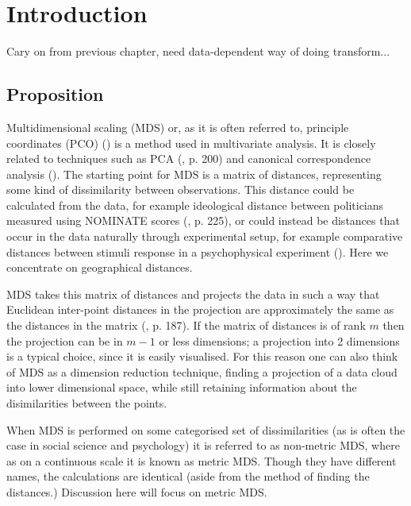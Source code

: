 
\label{chap-mds}

\section{Introduction}

Cary on from previous chapter, need data-dependent way of doing transform...

\subsection{Proposition}

Multidimensional scaling (MDS) or, as it is often referred to, principle coordinates (PCO) (\cite{gower1966}) is a method used in multivariate analysis. It is closely related to techniques such as PCA (\cite{chatfieldcollins}, p. 200) and canonical correspondence analysis (\cite{terbraak}). The starting point for MDS is a matrix of distances, representing some kind of dissimilarity between observations. This distance could be calculated from the data, for example ideological distance between politicians measured using NOMINATE scores (\cite{quantss}, p. 225), or could instead be distances that occur in the data naturally through experimental setup,  for example comparative distances between stimuli response in a psychophysical experiment (\cite{torgerson}). Here we concentrate on geographical distances.

MDS takes this matrix of distances and projects the data in such a way that Euclidean inter-point distances in the projection are approximately the same as the distances in the matrix (\cite{chatfieldcollins}, p. 187). If the matrix of distances is of rank $m$ then the projection can be in $m-1$ or less dimensions; a projection into 2 dimensions is a typical choice, since it is easily visualised. For this reason one can also think of MDS as a dimension reduction technique, finding a projection of a data cloud into lower dimensional space, while still retaining information about the disimilarities between the points.

When MDS is performed on some categorised set of dissimilarities (as is often the case in social science and psychology) it is referred to as non-metric MDS, where as on a continuous scale it is known as metric MDS. Though they have different names, the calculations are identical (aside from the method of finding the distances.) Discussion here will focus on metric MDS.


